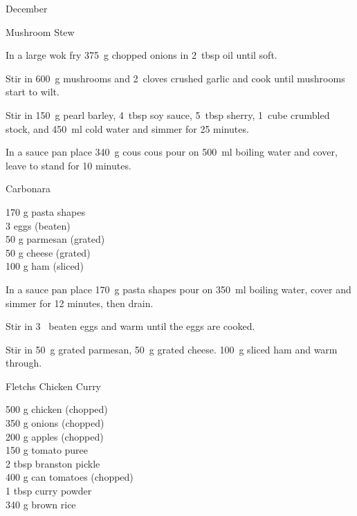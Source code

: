 \begin{menu}{December}
\begin{recipe}{2}{Mushroom Stew}
    \begin{instructions}
    \item 
        In a large wok fry
        375~g chopped onions
        in
        2~tbsp  oil
        until soft.
      \item 
        Stir in
        600~g  mushrooms
        and
        2~cloves crushed garlic
        and cook until mushrooms start to wilt.
      \item 
        Stir in
        150~g  pearl barley,
        4~tbsp  soy sauce,
        5~tbsp  sherry,
        1~cube crumbled stock,
        and
        450~ml  cold water
        and simmer for 25 minutes.
      \item 
    In a
    sauce pan
    place
    340~g  cous cous
    pour on
    500~ml  boiling water
    and cover, leave to stand for 10 minutes.
  
    \end{instructions}
    \end{recipe}%
  
    \begin{recipe}{1}{Carbonara}%
		\begin{ingredients}
		170 g pasta shapes  \\
	3  eggs (beaten) \\
	50 g parmesan (grated) \\
	50 g cheese (grated) \\
	100 g ham (sliced) \\
	
		\end{ingredients}
	
	
    \begin{instructions}
    \item 
    In a
    sauce pan
    place
    170~g  pasta shapes
    pour on
    350~ml  boiling water,
    cover and simmer for 12 minutes, then drain.
  \item 
        Stir in
        3~ beaten eggs
        and warm until the eggs are cooked.
      \item 
        Stir in
        50~g grated parmesan,
        50~g grated cheese.
        100~g sliced ham
        and warm through.
      
    \end{instructions}
    \end{recipe}%
  
    \begin{recipe}{2}{Fletchs Chicken Curry}%
		\begin{ingredients}
		500 g chicken (chopped) \\
	350 g onions (chopped) \\
	200 g apples (chopped) \\
	150 g tomato puree  \\
	2 tbsp branston pickle  \\
	400 g can tomatoes (chopped) \\
	1 tbsp curry powder  \\
	340 g brown rice  \\
	

\end{ingredients}
\end{recipe}
\end{menu}
